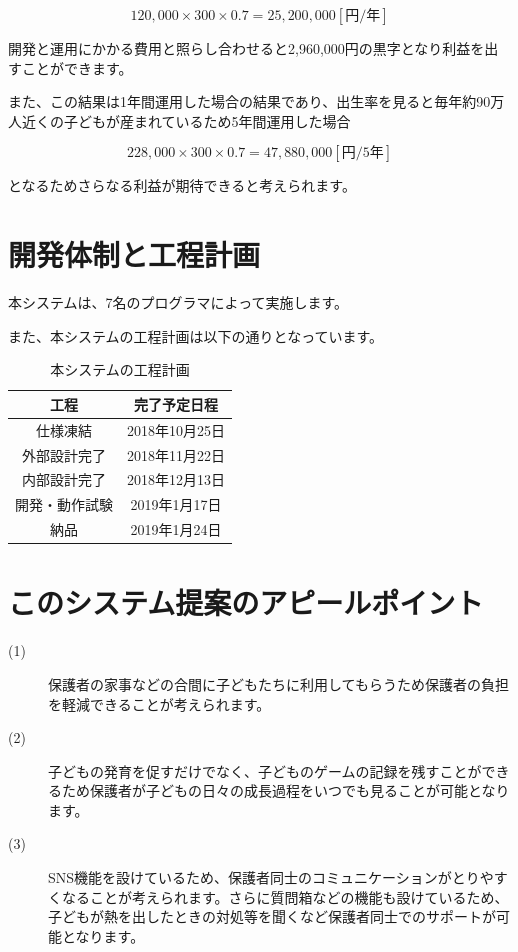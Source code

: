 \documentclass[a4j]{jarticle}
\begin{document}
\begin{equation}
  120,000×300×0.7 = 25,200,000 [円/年]
\end{equation}

開発と運用にかかる費用と照らし合わせると2,960,000円の黒字となり利益を出すことができます。\par
また、この結果は1年間運用した場合の結果であり、出生率を見ると毎年約90万人近くの子どもが産まれているため5年間運用した場合

\begin{equation}
  228,000×300×0.7 = 47,880,000　[円/5年]
\end{equation}

となるためさらなる利益が期待できると考えられます。



\section{開発体制と工程計画}
本システムは、7名のプログラマによって実施します。\par
また、本システムの工程計画は以下の通りとなっています。

\begin{table}[!h]
  \centering
  \caption{本システムの工程計画}
  \begin{tabular}{|c|c|}
    \hline
    \multicolumn{1}{|c|}{工程} & \multicolumn{1}{c|}{完了予定日程} \\ \hline \hline
    仕様凍結 & 2018年10月25日  \\ \hline
    外部設計完了 & 2018年11月22日  \\ \hline
    内部設計完了 & 2018年12月13日 \\ \hline
    開発・動作試験 & 2019年1月17日  \\ \hline
    納品 & 2019年1月24日  \\ \hline
  \end{tabular}
\end{table}


\section{このシステム提案のアピールポイント}
\begin{description}
\item[(1)]保護者の家事などの合間に子どもたちに利用してもらうため保護者の負担を軽減できることが考えられます。
\item[(2)]子どもの発育を促すだけでなく、子どものゲームの記録を残すことができるため保護者が子どもの日々の成長過程をいつでも見ることが可能となります。
\item[(3)]SNS機能を設けているため、保護者同士のコミュニケーションがとりやすくなることが考えられます。さらに質問箱などの機能も設けているため、子どもが熱を出したときの対処等を聞くなど保護者同士でのサポートが可能となります。
\end{description}
\end{document}

